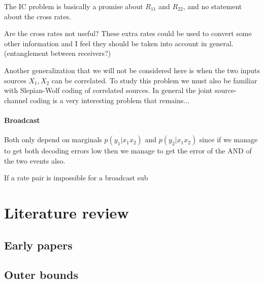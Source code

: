 \documentclass[aps,11pt,twoside,letterpaper]{revtex4}
\begin{document}
            The IC problem is basically a promise about $R_{11}$ and $R_{22}$,
            and no statement about the cross rates.
            
            Are the cross rates not useful? 
            These extra rates could be used to convert some other information 
            and I feel they should be taken into account in general.
            (entanglement between receivers?)
            
            
            Another generalization that we will not be considered here is
            when the two inputs sources $X_1,X_2$ can be correlated.
            To study this problem we must also be familiar with Slepian-Wolf
            coding of correlated sources. In general the joint source-channel coding
            is a very interesting problem that remains...
            
            
        \paragraph{Broadcast}

            Both only depend on marginals $p(y_1|x_1x_2)$ and $p(y_2|x_1x_2)$ since 
            if we manage to get both decoding errors low then we manage to get the
            error of the AND of the two events also. 

            If a rate pair is impossible for a broadcast sub
           




\section{Literature review}

    \subsection{Early papers}

        \cite{Ahlswede1974}
        \cite{Sato77}


    \subsection{Outer bounds}
   
\end{document}
